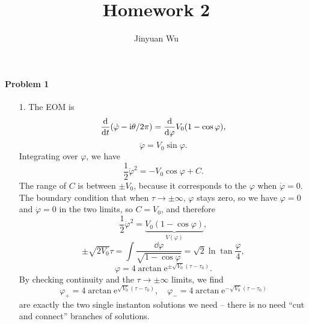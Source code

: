 \documentclass[hyperref, a4paper]{article}
\title{Homework 2}
\author{Jinyuan Wu}
\newcommand*{\ii}{\mathrm{i}}
\newcommand*{\ee}{\mathrm{e}}
\begin{document}
\maketitle

\paragraph{Problem 1} \begin{itemize}
\item[1.] The EOM is 
\[
    \dv{t} (\dot{\varphi} - \ii \theta / 2\pi) = \dv{\varphi} V_0 (1 - \cos \varphi),
\]
\begin{equation}
    \ddot{\varphi} = V_0 \sin \varphi.
\end{equation}
Integrating over $\varphi$, we have 
\begin{equation}
    \frac{1}{2} \dot{\varphi}^2 = - V_0 \cos \varphi + C.
\end{equation}
The range of $C$ is between $\pm V_0$,
because it corresponds to the $\varphi$ when $\dot{\varphi} = 0$.
The boundary condition that when $\tau \to \pm \infty$, 
$\varphi$ stays zero,
so we have $\varphi = 0$ and $\dot{\varphi} = 0$ in the two limits,
so $C = V_0$,
and therefore 
\begin{equation}
    \frac{1}{2} \dot{\varphi}^2 = \underbrace{V_0 (1 - \cos \varphi)}_{V(\varphi)} ,
\end{equation}
\[
    \pm \sqrt{2 V_0} \tau = \int \frac{\dd{\varphi}}{\sqrt{1 - \cos \varphi}}
    = \sqrt{2} \ln \tan \frac{\varphi}{4},
\]
\[
    \varphi = 4 \arctan \ee^{\pm \sqrt{V_0} (\tau - \tau_0)}.
\]
By checking continuity and the $\tau \to \pm \infty$ limits,
we find 
\begin{equation}
    \varphi_+ = 4 \arctan \ee^{\sqrt{V_0} (\tau - \tau_0)},
    \quad \varphi_- = 4 \arctan \ee^{- \sqrt{V_0} (\tau - \tau_0)}
\end{equation}
are exactly the two single instanton solutions we need -- 
there is no need ``cut and connect'' branches of solutions.


\end{itemize}
\end{document}
